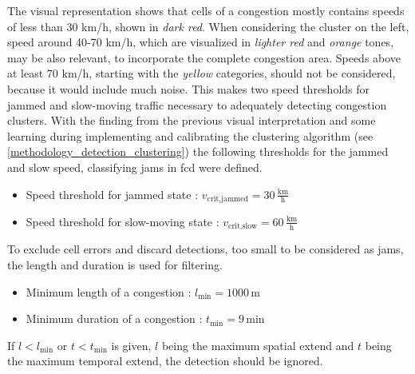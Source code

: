 The visual representation shows that cells of a congestion mostly contains speeds of less than 30 km/h, shown in \textit{dark red}. When considering the cluster on the left, speed around 40-70 km/h, which are visualized in \textit{lighter red} and \textit{orange} tones, may be also relevant, to incorporate the complete congestion area. Speeds above at least 70 km/h, starting with the \textit{yellow} categories, should not be considered, because it would include much noise. This makes two speed thresholds for jammed and slow-moving traffic necessary to adequately detecting congestion clusters. With the finding from the previous visual interpretation and some learning during implementing and calibrating the clustering algorithm (see \cref{methodology_detection_clustering}) the following thresholds for the jammed and slow speed, classifying jams in \acrshort{fcd} were defined.

\begin{itemize}
	\item Speed threshold for jammed state : $v_{\text{crit},\text{jammed}} = 30\,\frac{\text{km}}{\text{h}}$
	\item Speed threshold for slow-moving state : $v_{\text{crit},\text{slow}} = 60\,\frac{\text{km}}{\text{h}}$
\end{itemize}

To exclude cell errors and discard detections, too small to be considered as jams, the length and duration is used for filtering. 

\begin{itemize}
	\item Minimum length of a congestion : $l_{\text{min}} = 1000$\,m
	\item Minimum duration of a congestion : $t_{\text{min}} = 9$\,min
\end{itemize}

If $l < l_{\text{min}}$ or $t < t_{\text{min}}$ is given, $l$ being the maximum spatial extend and $t$ being the maximum temporal extend, the detection should be ignored.

